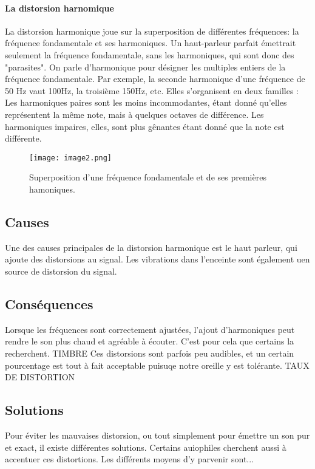 \documentclass{article}
\begin{document}
\paragraph{La distorsion harnomique}
La distorsion harmonique joue sur la superposition de différentes fréquences:
la fréquence fondamentale et ses harmoniques. Un haut-parleur parfait émettrait seulement la fréquence fondamentale, sans les harmoniques, qui sont donc des "parasites".
On parle d'harmonique pour désigner les multiples entiers de la fréquence fondamentale.
Par exemple, la seconde harmonique d'une fréquence de 50 Hz vaut 100Hz, la troisième 150Hz, etc.
Elles s'organisent en deux familles : 
Les harmoniques paires sont les moins incommodantes, étant donné qu'elles représentent la même note, mais à quelques octaves de différence.
Les harmoniques impaires, elles, sont plus gênantes étant donné que la note est différente.



\begin{figure}[h]
\centering
\texttt{[image: image2.png]}
\caption{Superposition d'une fréquence fondamentale et de ses premières hamoniques.}
\label{Superposition d'une fréquence fondamentale et de ses premières hamoniques.}
\end{figure}



\subsection{Causes}
Une des causes principales de la distorsion harmonique est le haut parleur, qui ajoute des distorsions au signal.
Les vibrations dans l'enceinte sont également uen source de distorsion du signal.


\subsection{Conséquences}
Lorsque les fréquences sont correctement ajustées, l'ajout d'harmoniques peut rendre le son plus chaud et 
agréable à écouter. C'est pour cela que certains la recherchent.
TIMBRE
Ces distorsions sont parfois peu audibles, et un certain pourcentage est tout à fait acceptable puisuqe notre
oreille y est tolérante.
TAUX DE DISTORTION


\subsection{Solutions}
Pour éviter les mauvaises distorsion, ou tout simplement pour émettre un son pur et exact, il existe différentes
solutions.
Certains auiophiles cherchent aussi à accentuer ces distortions. Les différents  moyens d'y parvenir sont...




\end{document}

